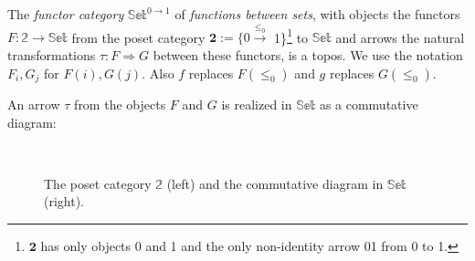	\begin{ex}
		The \emph{functor category} $\mathbb{Set}^{0 \rightarrow 1}$ of \emph{functions between sets}, with objects the functors $F :\mathbb{2} \rightarrow \mathbb{Set}$ from the poset category $\mathbf{2}:=\{0 \xrightarrow{\leq_0}$ 1\}\footnote{$\mathbf{2}$ has only objects 0 and 1 and the only non-identity arrow 01 from 0 to 1.} to $\mathbb{Set}$ and arrows the natural transformations $\tau : F \Rightarrow G$ between these functors, is a topos.
		 \newline
		We use the notation $F_i, G_j$ for $F(i),G(j)$. Also $f$ replaces $F(\leq_0)$ and $g$ replaces $G(\leq_0)$.\newline
		
		An arrow $\tau$ from the objects $F$ and $G$ is realized in $\mathbb{Set}$ as a commutative diagram:
		
		\begin{figure}[h]
			\centering
			\
			\caption{The poset category $\mathbb{2}$ (left) and the commutative diagram in $\mathbb{Set}$ (right).}
		\end{figure}  
		

\end{ex}
